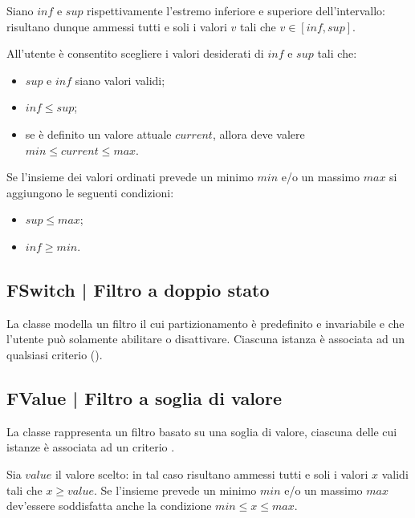 \documentclass[10pt,a4paper,headinclude,footinclude,hidelinks]{scrreprt} %
\begin{document}
	Siano $inf$ e $sup$ rispettivamente l'estremo inferiore e superiore dell'intervallo: risultano dunque ammessi tutti e soli i valori $v$ tali che $v \in \left[inf,sup\right]$.

	All'utente è consentito scegliere i valori desiderati di $inf$ e $sup$ tali che:
	\begin{itemize}
	\item $sup$ e $inf$ siano valori validi;
	\item $inf \leq sup$;
	\item se è definito un valore attuale $current$, allora deve valere $min \leq current \leq max$.
	\end{itemize}

	Se l'insieme dei valori ordinati prevede un minimo $min$ e/o un massimo $max$ si aggiungono le seguenti condizioni:
	\begin{itemize}
	\item $sup \leq max$;
	\item $inf \geq min$.
	\end{itemize}

	\subsection[FSwitch]{FSwitch | Filtro a doppio stato}
	\label{sec:stage:design:model.filter:switch-filter}
	La classe \textit{} modella un filtro il cui partizionamento è predefinito e invariabile e che l'utente può solamente abilitare o disattivare. Ciascuna istanza è associata ad un qualsiasi criterio (\textit{}).

	\subsection[FValue]{FValue | Filtro a soglia di valore}
	\label{sec:stage:design:model.filter:value-filter}
	La classe \textit{} rappresenta un filtro basato su una soglia di valore, ciascuna delle cui istanze è associata ad un criterio \textit{}.

	Sia $value$ il valore scelto: in tal caso risultano ammessi tutti e soli i valori $x$ validi tali che $x \geq value$. Se l'insieme prevede un minimo $min$ e/o un massimo $max$ dev'essere soddisfatta anche la condizione $min \leq x \leq max$.

\end{document}
